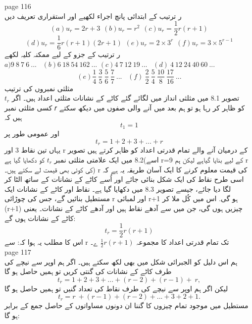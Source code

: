 page 116\\
ر ترتیب کے ابتدائی پانچ اجراء لکھیے اور استقراری تعریف دیں \\
\[(a) u_{r} = 2r + 3  \hspace{5pt} (b) u_{r} = r^{2} \hspace{5pt} (c) u_{r} = \frac{1}{2}r(r  +  1)  \]  
\[(d) u_{r} = \frac{1}{6}r(r+1)(2r+1)  \hspace{5pt} (e) u_{r} = 2 \times 3^{r}  \hspace{5pt} (f) u_{r} = 3 \times 5^{r-1}\]
ر ترتیب کے جزو کے لیے ممکنہ کلیہ لکھے \\
\(a) 9 \: 8 \: 7 \: 6 \: ... \hspace{10pt} (b) 6 \: 18 \: 54 \: 162 \: ... \)
\((c) 4 \: 7 \: 12 \: 19 \: ... \hspace{10pt} (d)\ 4 \: 12 \: 24 \: 40 \: 60 \: ...\)
\[(e)\frac{1}{4} \: \frac{3}{5} \: \frac{5}{6} \: \frac{7}{7} \: ...\hspace{10pt} (f)\ \frac{2}{2} \: \frac{5}{4} \: \frac{10}{8} \: \frac{17}{16} \: ...\]
مثلثی نمبروں کی ترتیب\\
تصویر 8.1 میں مثلثی انداز میں لگائے گئے کاٹے کے نشانات مثلثی اعداد ہیں۔ اگر
\(t_{r}\)
کسی مثلثی نمبر 𝑟 کو ظاہر کر رہا ہو تو ہم بعد میں آنے والی صفوں میں دیکھ سکتے ہیں کہ
\[t_{1}=1\]
اور عمومی طور پر
\[t_{r}=1+2+3+ ... + r\]
یہاں تین نقاط
3
اور
r
کے درمیان آنے والے تمام قدرتی اعداد کو ظاہر کرتے ہیں
تصویر 8.2 میں ایک علامتی مثلثی نمبر 
\(t_{r}\)
کو دکھایا گیا ہے(اسے r=9 کے لیے بنایا گیاہے لیکن ہم r کی کوئی بھی قیمت لے سکتے ہیں۔)
r
کی قیمت معلوم کرنے کا ایک آسان طریقہ یہ ہے کہ اسی طرح نقاط کی ایک شکل بنائی جائے اور اُسے کاٹے کے نشانات کے ساتھ الٹا کر لگا دیا جائے، جیسے تصویر 8.3 میں دکھایا گیا ہے۔ نقاط اور کاٹے کے نشانات ایک مستطیل بنائیں گے، جس کی چوڑائی
r
اور لمبائی 
r+1
ہو گی.
اس میں کُل ملا کر 
(r+1)
چیزیں ہوں گی، جن میں سے آدھے نقاط ہیں اور آدھے کاٹے کے نشانات۔ یعنی کاٹے کے نشانات ہوں گے:
\[t_{r}=\frac{1}{2}r(r+1)\]
اس کا مطلب یہ ہوا کہ:
سے
r
تک تمام قدرتی اعداد کا مجموعہ 
\(\frac{1}{2}r(r+1)\)
ے۔\\
\clearpage
page 117\\
ہم اس دلیل کو الجبرائی شکل میں بھی لکھ سکتے ہیں۔ اگر ہم اوپر سے نیچے کی طرف کاٹے کے نشانات کی گنتی کریں تو ہمیں حاصل ہو گا\\
\[ t_{r} =  1 +  2  +  3  +  ... + (r - 2) + (r - 1) + \: r ,\]
لیکن اگر ہم اوپر سے نیچے کی طرف نقاط کی تعداد گنیں تو ہمیں حاصل ہو گا\\
\[t_{r} = r \: + (r - 1) + (r - 2) + ...  + 3 + 2 + 1.\]
مستطیل میں موجود تمام چیزوں کا گننا ان دونوں مساواتوں کے حاصل جمع کے برابر ہو گا:\\
